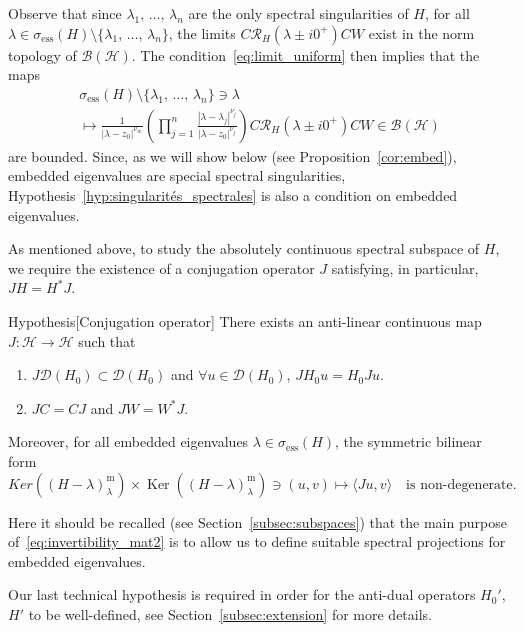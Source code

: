 \documentclass[AHL,Unicode,longabstracts,published]{cedram}
\newcommand{\Hi}{\mathcal{H}}
\newcommand{\ess}{\mathrm{ess}}
\newcommand{\Res}{\mathcal{R}}
\newcommand{\clB}{\mathcal{B}}
\newcommand{\clD}{\mathcal{D}}
\DeclareMathOperator{\Ker}{Ker}
\newcommand*{\romanenumi}{\renewcommand*{\theenumi}{\roman{enumi}}}
\let\oldforall\forall
\renewcommand*{\forall}{\mathrel{\oldforall}}
\newcommand{\Hi}{\mathcal{H}}
\newcommand{\ess}{\mathrm{ess}}
\begin{document}
Observe that since $\lambda_1,\,\dots,\,\lambda_n$ are the only spectral singularities of $H$, for all $\lambda\in \sigma_{\ess}(H)\setminus\{\lambda_1,\,\dots,\,\lambda_n\}$, the limits $C\Res_H(\lambda\pm i0^+)CW$ exist in the norm topology of $\clB(\Hi)$. The condition~\eqref{eq:limit_uniform} then implies that the maps
\begin{multline}
\sigma_{\ess}(H)\setminus\{\lambda_1,\,\dots,\,\lambda_n\} \ni \lambda \\
\mapsto \frac{1}{|\lambda-z_0|^{\nu_\infty}} \left(\prod_{j=1}^n\frac{ |\lambda-\lambda_j|^{\nu_j} }{ |\lambda-z_0|^{\nu_j} } \right) C\Res_H\left(\lambda\pm i0^+\right)C W \in \clB(\Hi)
\end{multline}
are bounded. Since, as we will show below (see Proposition~\ref{cor:embed}), embedded eigenvalues are special spectral singularities, Hypothesis~\ref{hyp:singularités_spectrales} is also a condition on embedded eigenvalues.


As mentioned above, to study the absolutely continuous spectral subspace of $H$, we require the existence of a conjugation operator $J$ satisfying, in particular, $JH=H^* J$.

\begin{enonce}
{Hypothesis}[Conjugation operator]\label{hyp:Conjugate_operator}
There exists an anti-linear continuous map $J:\Hi\to\Hi$ such that
\begin{enumerate}\romanenumi
\item $J\clD(H_0)\subset\clD(H_0)$ and $\forall u\in\clD(H_0)$, $JH_0u=H_0Ju$.
\item $JC=CJ$ and $JW=W^* J$.
\end{enumerate}
Moreover, for all embedded eigenvalues $\lambda\in\sigma_{\ess}(H)$, the symmetric bilinear form
\begin{equation}\label{eq:invertibility_mat2}
Ker((H-\lambda)^\mathrm{m}_\lambda)\times\Ker((H-\lambda)^\mathrm{m}_\lambda) \ni (u,v)\mapsto \langle Ju,v\rangle \quad\text{is non-degenerate}.
\end{equation}
\end{enonce}

Here it should be recalled (see Section~\ref{subsec:subspaces}) that the main purpose of~\eqref{eq:invertibility_mat2} is to allow us to define suitable spectral projections for embedded eigenvalues.


Our last technical hypothesis is required in order for the anti-dual operators $H_0'$, $H'$ to be well-defined, see Section~\ref{subsec:extension} for more details.
\end{document}
